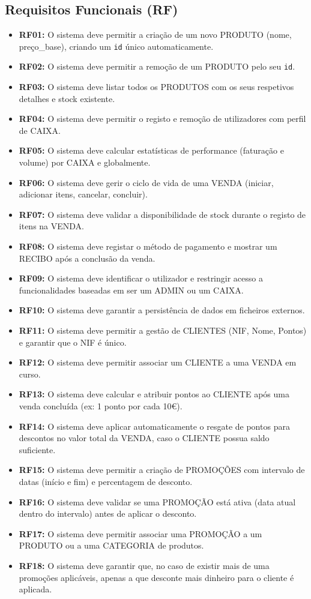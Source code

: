 \documentclass[a4paper]{llncs}
\begin{document}
\subsection{Requisitos Funcionais (RF)}
\begin{itemize}
    \item \textbf{RF01:} O sistema deve permitir a criação de um novo PRODUTO (nome, preço\_base), criando um \texttt{id} único automaticamente.
    \item \textbf{RF02:} O sistema deve permitir a remoção de um PRODUTO pelo seu \texttt{id}.
    \item \textbf{RF03:} O sistema deve listar todos os PRODUTOS com os seus respetivos detalhes e stock existente.
    \item \textbf{RF04:} O sistema deve permitir o registo e remoção de utilizadores com perfil de CAIXA.
    \item \textbf{RF05:} O sistema deve calcular estatísticas de performance (faturação e volume) por CAIXA e globalmente.
    \item \textbf{RF06:} O sistema deve gerir o ciclo de vida de uma VENDA (iniciar, adicionar itens, cancelar, concluir).
    \item \textbf{RF07:} O sistema deve validar a disponibilidade de stock durante o registo de itens na VENDA.
    \item \textbf{RF08:} O sistema deve registar o método de pagamento e mostrar um RECIBO após a conclusão da venda.
    \item \textbf{RF09:} O sistema deve identificar o utilizador e restringir acesso a funcionalidades baseadas em ser um ADMIN ou um CAIXA.
    \item \textbf{RF10:} O sistema deve garantir a persistência de dados em ficheiros externos.
    \item \textbf{RF11:} O sistema deve permitir a gestão de CLIENTES (NIF, Nome, Pontos) e garantir que o NIF é único.
    \item \textbf{RF12:} O sistema deve permitir associar um CLIENTE a uma VENDA em curso.
    \item \textbf{RF13:} O sistema deve calcular e atribuir pontos ao CLIENTE após uma venda concluída (ex: 1 ponto por cada 10€).
    \item \textbf{RF14:} O sistema deve aplicar automaticamente o resgate de pontos para descontos no valor total da VENDA, caso o CLIENTE possua saldo suficiente.
    \item \textbf{RF15:} O sistema deve permitir a criação de PROMOÇÕES com intervalo de datas (início e fim) e percentagem de desconto.
    \item \textbf{RF16:} O sistema deve validar se uma PROMOÇÃO está ativa (data atual dentro do intervalo) antes de aplicar o desconto.
    \item \textbf{RF17:} O sistema deve permitir associar uma PROMOÇÃO a um PRODUTO ou a uma CATEGORIA de produtos.
    \item \textbf{RF18:} O sistema deve garantir que, no caso de existir mais de uma promoções aplicáveis, apenas a que desconte mais dinheiro para o cliente é aplicada.
\end{itemize}
\end{document}
